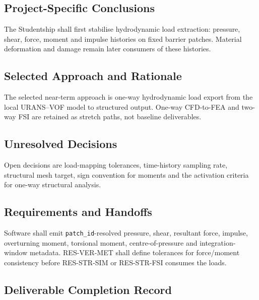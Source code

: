 
\subsection{Project-Specific Conclusions}
\label{sec:res-str-lod-conclusions}

The Studentship shall first stabilise hydrodynamic load extraction:
pressure, shear, force, moment and impulse histories on fixed barrier
patches. Material deformation and damage remain later consumers of
these histories.

\subsection{Selected Approach and Rationale}
\label{sec:res-str-lod-selected-approach}

The selected near-term approach is one-way hydrodynamic load export
from the local URANS--VOF model to structured output. One-way
CFD-to-FEA and two-way FSI are retained as stretch paths, not baseline
deliverables.

\subsection{Unresolved Decisions}
\label{sec:res-str-lod-unresolved-decisions}

Open decisions are load-mapping tolerances, time-history sampling
rate, structural mesh target, sign convention for moments and the
activation criteria for one-way structural analysis.

\subsection{Requirements and Handoffs}
\label{sec:res-str-lod-requirements}

Software shall emit \texttt{patch\_id}-resolved pressure, shear,
resultant force, impulse, overturning moment, torsional moment,
centre-of-pressure and integration-window metadata. RES-VER-MET shall
define tolerances for force/moment consistency before RES-STR-SIM or
RES-STR-FSI consumes the loads.

\subsection{Deliverable Completion Record}
\label{sec:res-str-lod-completion-record}

%
%
%
